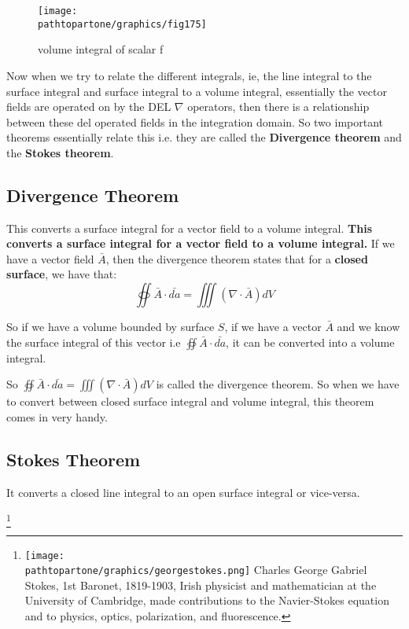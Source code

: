 \begin{figure}
\centering
\texttt{[image: \\pathtopartone/graphics/fig175]}
\caption{volume integral of scalar f}
\label{fig:page-8}
\end{figure}

Now when we try to relate the different integrals, ie, the line integral to the surface integral and surface integral to a volume integral, essentially the vector fields are operated on by the DEL $\nabla$ operators, then there is a relationship between these del operated fields in the integration domain. So two important theorems essentially relate this i.e. they are called the \textbf{Divergence theorem} and the \textbf{Stokes theorem}.

\subsection {Divergence Theorem}
This converts a surface integral for a vector field to a volume integral. \textbf{This converts a surface integral for a vector field to a volume integral.} If we have a vector field $\bar{A}$, then the divergence theorem states that for a \textbf{closed surface}, we have that:
\begin{equation}
\oiint \bar{A} \cdot \bar{da} = \iiint (\nabla \cdot \bar{A})dV
\end{equation}


So if we have a volume bounded by surface $S$, if we have a vector $\bar{A}$ and we know the surface integral of this vector i.e $\oiint \bar{A}\cdot\bar{da}$, it can be converted into a volume integral.


So $\oiint \bar{A} \cdot \bar{da} = \iiint (\nabla \cdot \bar{A})dV$ is called the divergence theorem. So when we have to convert between closed surface integral and volume integral, this theorem comes in very handy.

\subsection{Stokes Theorem}
It converts a closed line integral to an open surface integral or vice-versa.

\footnote{
\texttt{[image: \\pathtopartone/graphics/georgestokes.png]}
Charles George Gabriel Stokes, 1st Baronet, 1819-1903, Irish physicist and mathematician at the University of Cambridge, made contributions to the Navier-Stokes equation and to physics, optics, polarization, and fluorescence.
}

